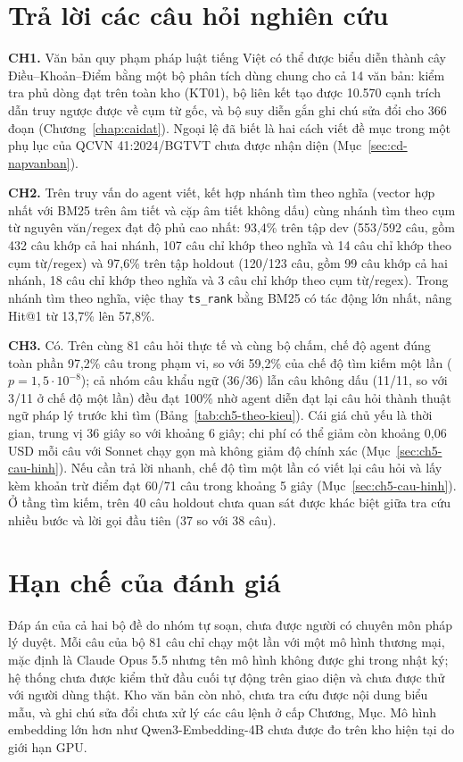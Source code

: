 \section{Trả lời các câu hỏi nghiên cứu}
\label{sec:ch5-danh-gia-chung}

\textbf{CH1.} Văn bản quy phạm pháp luật tiếng Việt có thể được biểu diễn thành cây Điều--Khoản--Điểm bằng một bộ phân tích dùng chung cho cả 14 văn bản: kiểm tra phủ dòng đạt trên toàn kho (KT01), bộ liên kết tạo được 10.570 cạnh trích dẫn truy ngược được về cụm từ gốc, và bộ suy diễn gắn ghi chú sửa đổi cho 366 đoạn (Chương~\ref{chap:caidat}). Ngoại lệ đã biết là hai cách viết đề mục trong một phụ lục của QCVN 41:2024/BGTVT chưa được nhận diện (Mục~\ref{sec:cd-napvanban}).

\textbf{CH2.} Trên truy vấn do agent viết, kết hợp nhánh tìm theo nghĩa (vector hợp nhất với BM25 trên âm tiết và cặp âm tiết không dấu) cùng nhánh tìm theo cụm từ nguyên văn/regex đạt độ phủ cao nhất: 93,4\% trên tập dev (553/592 câu, gồm 432 câu khớp cả hai nhánh, 107 câu chỉ khớp theo nghĩa và 14 câu chỉ khớp theo cụm từ/regex) và 97,6\% trên tập holdout (120/123 câu, gồm 99 câu khớp cả hai nhánh, 18 câu chỉ khớp theo nghĩa và 3 câu chỉ khớp theo cụm từ/regex). Trong nhánh tìm theo nghĩa, việc thay \texttt{ts\_rank} bằng BM25 có tác động lớn nhất, nâng Hit@1 từ 13,7\% lên 57,8\%.

\textbf{CH3.} Có. Trên cùng 81 câu hỏi thực tế và cùng bộ chấm, chế độ agent đúng toàn phần 97,2\% câu trong phạm vi, so với 59,2\% của chế độ tìm kiếm một lần ($p = 1{,}5\cdot10^{-8}$); cả nhóm câu khẩu ngữ (36/36) lẫn câu không dấu (11/11, so với 3/11 ở chế độ một lần) đều đạt 100\% nhờ agent diễn đạt lại câu hỏi thành thuật ngữ pháp lý trước khi tìm (Bảng~\ref{tab:ch5-theo-kieu}). Cái giá chủ yếu là thời gian, trung vị 36 giây so với khoảng 6 giây; chi phí có thể giảm còn khoảng 0,06 USD mỗi câu với Sonnet chạy gọn mà không giảm độ chính xác (Mục~\ref{sec:ch5-cau-hinh}). Nếu cần trả lời nhanh, chế độ tìm một lần có viết lại câu hỏi và lấy kèm khoản trừ điểm đạt 60/71 câu trong khoảng 5 giây (Mục~\ref{sec:ch5-cau-hinh}). Ở tầng tìm kiếm, trên 40 câu holdout chưa quan sát được khác biệt giữa tra cứu nhiều bước và lời gọi đầu tiên (37 so với 38 câu).

\section{Hạn chế của đánh giá}

Đáp án của cả hai bộ đề do nhóm tự soạn, chưa được người có chuyên môn pháp lý duyệt. Mỗi câu của bộ 81 câu chỉ chạy một lần với một mô hình thương mại, mặc định là Claude Opus 5.5 nhưng tên mô hình không được ghi trong nhật ký; hệ thống chưa được kiểm thử đầu cuối tự động trên giao diện và chưa được thử với người dùng thật. Kho văn bản còn nhỏ, chưa tra cứu được nội dung biểu mẫu, và ghi chú sửa đổi chưa xử lý các câu lệnh ở cấp Chương, Mục. Mô hình embedding lớn hơn như Qwen3-Embedding-4B chưa được đo trên kho hiện tại do giới hạn GPU.

